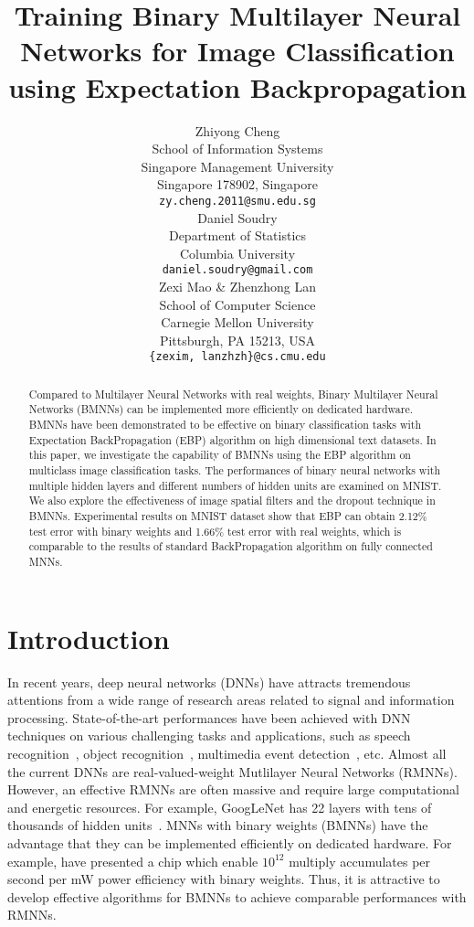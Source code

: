 \documentclass{article} %
\title{Training Binary Multilayer Neural Networks for Image Classification using Expectation Backpropagation}
\author{
Zhiyong Cheng \\
School of Information Systems\\
Singapore Management University\\
Singapore 178902, Singapore \\
\texttt{zy.cheng.2011@smu.edu.sg} \\
\And
Daniel Soudry \\
Department of Statistics\\
Columbia University\\
\texttt{daniel.soudry@gmail.com} \\
\And
Zexi Mao \& Zhenzhong Lan \\
School of Computer Science\\
Carnegie Mellon University\\
Pittsburgh, PA 15213, USA \\
\texttt{\{zexim, lanzhzh\}@cs.cmu.edu} \\
}
\begin{document}
\maketitle

\begin{abstract}
Compared to Multilayer Neural Networks with real weights, Binary Multilayer Neural Networks (BMNNs) can be implemented more efficiently on dedicated hardware. BMNNs have been demonstrated to be effective on binary classification tasks with Expectation BackPropagation (EBP) algorithm on high dimensional text datasets. In this paper, we investigate the capability of BMNNs using the EBP algorithm on multiclass image classification tasks.  The performances of binary neural networks with multiple hidden layers and different numbers of hidden units are examined on MNIST. We also explore the effectiveness of image spatial filters and the dropout technique in BMNNs. Experimental results on MNIST dataset show that EBP can obtain 2.12\% test error with binary weights and 1.66\% test error with real weights, which is comparable to the results of standard BackPropagation algorithm on fully connected MNNs.
\end{abstract}

\section{Introduction}
In recent years, deep neural networks (DNNs) have attracts tremendous attentions from a wide range of research areas related to signal and information processing.  State-of-the-art performances have been achieved with DNN techniques on various challenging tasks and applications, such as speech recognition~\citep{hinton2012deep}, object recognition~\citep{Krizhevsky2012,szegedy2014going},  multimedia event detection~\citep{lan2013cmu}, etc. Almost all the current DNNs are real-valued-weight Mutlilayer Neural Networks (RMNNs). However, an effective RMNNs are often massive and require large computational and energetic resources. For example, GoogLeNet has 22 layers with tens of thousands of hidden units~\citep{szegedy2014going}. MNNs with binary weights (BMNNs) have the advantage that they can be implemented efficiently on dedicated hardware. For example, \citet{karakiewicz2012} have presented a chip which enable  $10^{12}$ multiply accumulates per second per mW power efficiency with binary weights. Thus, it is attractive to develop effective algorithms for BMNNs to achieve
comparable performances with RMNNs.
\end{document}
